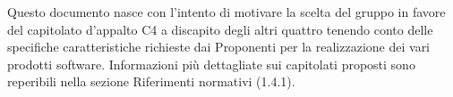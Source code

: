 Questo documento nasce con l'intento di motivare la scelta del gruppo in favore del capitolato d'appalto C4 a discapito degli altri quattro tenendo conto delle specifiche caratteristiche richieste dai Proponenti per la realizzazione dei vari prodotti software. Informazioni più dettagliate sui capitolati proposti sono reperibili nella sezione Riferimenti normativi (1.4.1).

